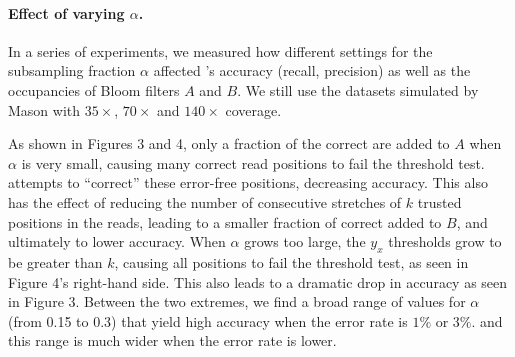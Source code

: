 \documentclass{bmcart}
\begin{document}

\paragraph{Effect of varying $\alpha$.} In a series of experiments, we measured how different settings for the subsampling fraction $\alpha$ affected \tool's accuracy (recall, precision) as well as the occupancies of Bloom filters $A$ and $B$.  We still use the datasets simulated by Mason with $35\times$, $70\times$ and $140\times$ coverage. 



As shown in Figures 3 and 4, only a fraction of the correct \kmers are added to $A$ when $\alpha$ is very small, causing many correct read positions to fail the threshold test.  \tool attempts to ``correct'' these error-free positions, decreasing accuracy.  This also has the effect of reducing the number of consecutive stretches of $k$ trusted positions in the reads, leading to a smaller fraction of correct \kmers added to $B$, and ultimately to lower accuracy.  When $\alpha$ grows too large, the $y_x$ thresholds grow to be greater than $k$, causing all positions to fail the threshold test, as seen in Figure 4's right-hand side.  This also leads to a dramatic drop in accuracy as seen in Figure 3.  Between the two extremes, we find a broad range of values for $\alpha$ (from 0.15 to 0.3) that yield high accuracy when the error rate is $1\%$ or $3\%$. and this range is much wider when the error rate is lower.

\end{document}
